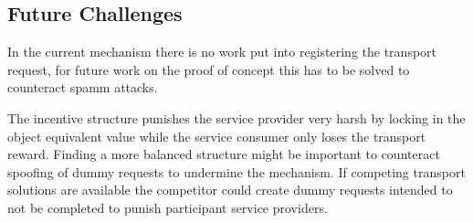 \subsection{Future Challenges}

In the current mechanism there is no work put into registering the transport request, for future work on the proof of concept this has to be solved to counteract spamm attacks. \par
The incentive structure punishes the service provider very harsh by locking in the object equivalent value while the service consumer only loses the transport reward. Finding a more balanced structure might be important to counteract spoofing of dummy requests to undermine the mechanism. If competing transport solutions are available the competitor could create dummy requests intended to not be completed to punish participant service providers.
%
%


